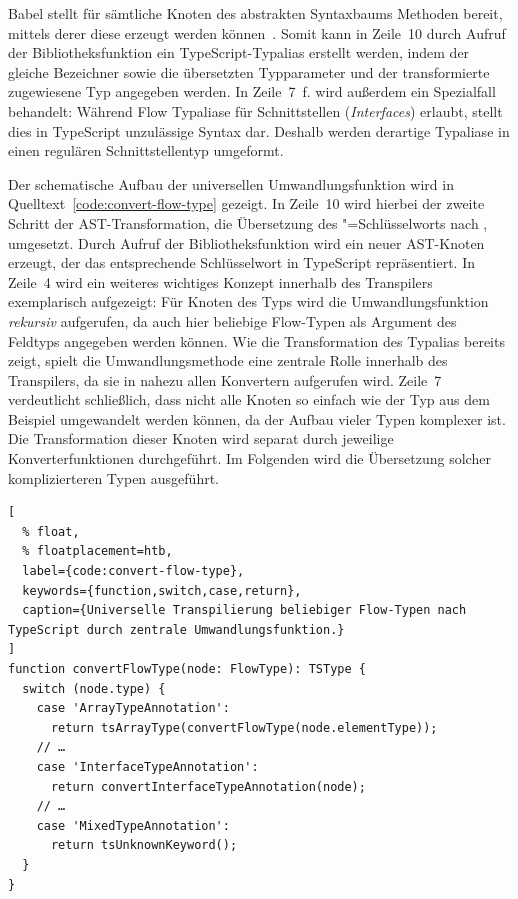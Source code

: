 Babel stellt für sämtliche Knoten des abstrakten Syntaxbaums Methoden bereit, mittels derer diese erzeugt werden können~\autocite{BABEL:TYPES}. Somit kann in Zeile~10 durch Aufruf der Bibliotheksfunktion  ein TypeScript-Typalias erstellt werden, indem der gleiche Bezeichner sowie die übersetzten Typparameter und der transformierte zugewiesene Typ angegeben werden. In Zeile~7~f. wird außerdem ein Spezialfall behandelt: Während Flow Typaliase für Schnittstellen (\textit{Interfaces}) erlaubt, stellt dies in TypeScript unzulässige Syntax dar. Deshalb werden derartige Typaliase in einen regulären Schnittstellentyp umgeformt.

Der schematische Aufbau der universellen Umwandlungsfunktion  wird in Quelltext~\ref{code:convert-flow-type} gezeigt. In Zeile~10 wird hierbei der zweite Schritt der AST-Transformation, die Übersetzung des "=Schlüsselworts nach , umgesetzt. Durch Aufruf der Bibliotheksfunktion  wird ein neuer AST-Knoten erzeugt, der das entsprechende Schlüsselwort in TypeScript repräsentiert.
In Zeile~4 wird ein weiteres wichtiges Konzept innerhalb des Transpilers exemplarisch aufgezeigt: Für Knoten des Typs  wird die Umwandlungsfunktion \emph{rekursiv} aufgerufen, da auch hier beliebige Flow-Typen als Argument des Feldtyps angegeben werden können. Wie die Transformation des Typalias bereits zeigt, spielt die Umwandlungsmethode  eine zentrale Rolle innerhalb des Transpilers, da sie in nahezu allen Konvertern aufgerufen wird. Zeile~7 verdeutlicht schließlich, dass nicht alle Knoten so einfach wie der Typ  aus dem Beispiel umgewandelt werden können, da der Aufbau vieler Typen komplexer ist. Die Transformation dieser Knoten wird separat durch jeweilige Konverterfunktionen durchgeführt. Im Folgenden wird die Übersetzung solcher komplizierteren Typen ausgeführt.

\begin{lstlisting}[
  % float,
  % floatplacement=htb,
  label={code:convert-flow-type},
  keywords={function,switch,case,return},
  caption={Universelle Transpilierung beliebiger Flow-Typen nach TypeScript durch zentrale Umwandlungsfunktion.}
]
function convertFlowType(node: FlowType): TSType {
  switch (node.type) {
    case 'ArrayTypeAnnotation':
      return tsArrayType(convertFlowType(node.elementType));
    // …
    case 'InterfaceTypeAnnotation':
      return convertInterfaceTypeAnnotation(node);
    // …
    case 'MixedTypeAnnotation':
      return tsUnknownKeyword();
  }
}
\end{lstlisting}

